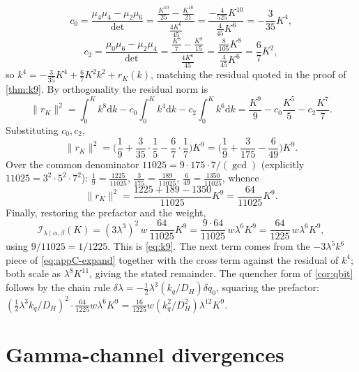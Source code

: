\documentclass[11pt]{article}
\newcommand{\dd}{\mathrm{d}}
\newcommand{\calI}{\mathcal I}
\begin{document}
\begin{equation}
c_0=\frac{\mu_4\mu_4-\mu_2\mu_6}{\det}
=\frac{\tfrac{K^{10}}{25}-\tfrac{K^{10}}{21}}{\tfrac{4K^6}{45}}
=\frac{-\tfrac{4}{525}K^{10}}{\tfrac{4}{45}K^6}=-\frac{3}{35}K^4,
\label{eq:appC-c0}
\end{equation}
\begin{equation}
c_2=\frac{\mu_0\mu_6-\mu_2\mu_4}{\det}
=\frac{\tfrac{K^8}{7}-\tfrac{K^8}{15}}{\tfrac{4K^6}{45}}
=\frac{\tfrac{8}{105}K^8}{\tfrac{4}{45}K^6}=\frac{6}{7}K^2,
\label{eq:appC-c2}
\end{equation}
so \(k^4=-\tfrac{3}{35}K^4+\tfrac67K^2k^2+r_K(k)\), matching the residual quoted in the proof of \cref{thm:k9}. By orthogonality the residual norm is
\begin{equation}
\|r_K\|^2=\int_0^K k^8\dd k-c_0\!\int_0^K k^4\dd k-c_2\!\int_0^K k^6\dd k
=\frac{K^9}{9}-c_0\frac{K^5}{5}-c_2\frac{K^7}{7}.
\label{eq:appC-resid}
\end{equation}
Substituting \(c_0,c_2\),
\begin{equation}
\|r_K\|^2=\Big(\frac19+\frac{3}{35}\cdot\frac15-\frac67\cdot\frac17\Big)K^9
=\Big(\frac{1}{9}+\frac{3}{175}-\frac{6}{49}\Big)K^9.
\label{eq:appC-collect}
\end{equation}
Over the common denominator \(11025=9\cdot175\cdot7/(\gcd)\) (explicitly \(11025=3^2\cdot5^2\cdot7^2\)): \(\tfrac19=\tfrac{1225}{11025}\), \(\tfrac{3}{175}=\tfrac{189}{11025}\), \(\tfrac{6}{49}=\tfrac{1350}{11025}\), whence
\begin{equation}
\|r_K\|^2=\frac{1225+189-1350}{11025}K^9=\frac{64}{11025}K^9.
\label{eq:appC-64}
\end{equation}
Finally, restoring the prefactor and the weight,
\begin{equation}
\calI_{\lambda\mid\alpha,\beta}(K)=(3\lambda^3)^2\,w\,\frac{64}{11025}K^9
=\frac{9\cdot64}{11025}\,w\lambda^6K^9=\frac{64}{1225}\,w\lambda^6K^9,
\label{eq:appC-done}
\end{equation}
using \(9/11025=1/1225\). This is \eqref{eq:k9}. The next term comes from the \(-3\lambda^5k^6\) piece of \eqref{eq:appC-expand} together with the cross term against the residual of \(k^4\); both scale as \(\lambda^8K^{11}\), giving the stated remainder. The quencher form of \cref{cor:qbit} follows by the chain rule \(\delta\lambda=-\tfrac12\lambda^3(k_q/D_H)\delta q_0\), squaring the prefactor: \((\tfrac12\lambda^3 k_q/D_H)^2\cdot\tfrac{64}{1225}w\lambda^6K^9=\tfrac{16}{1225}w(k_q^2/D_H^2)\lambda^{12}K^9\).

\section{Gamma-channel divergences}
\label{app:gamma}
\end{document}
